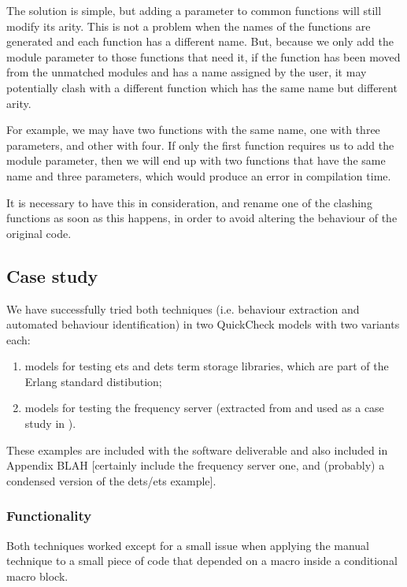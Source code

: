 The solution is simple, but adding a parameter to common functions
will still modify its arity. This is not a problem when the names
of the functions are generated and each function has a different name.
But, because we only add the module parameter to those functions that
need it, if the function has been moved from the unmatched 
modules and has a name assigned by the user, it may potentially clash
with a different function which has the same name but different arity.

For example, we may have two functions with the same name, one with
three parameters, and other with four. If only the first function
requires us to add the module parameter, then we will end up with two
functions that have the same name and three parameters, which would
produce an error in compilation time.

It is necessary to have this in consideration, and rename one of the
clashing functions as soon as this happens, in order to avoid altering
the behaviour of the original code.

\subsection{Case study}
\label{sec:case-study}

We have successfully tried both techniques  (i.e. behaviour extraction and automated behaviour identification) in two QuickCheck models with two variants each:

\begin{enumerate}
 \item models for testing ets and dets term storage libraries, which are part of the Erlang standard distibution;
 \item models for testing the frequency server (extracted from \cite{CesariniThompson} and used as a case study in \cite{ExtractingQC}).
\end{enumerate}
{\color{red} These examples are included with the software deliverable and also included in Appendix BLAH [certainly include the frequency server one, and (probably) a condensed version of the dets/ets example].}

\subsubsection{Functionality}

Both techniques worked except for a small issue when applying the manual technique to a small piece of code that 
depended on a macro inside a conditional macro block. 

